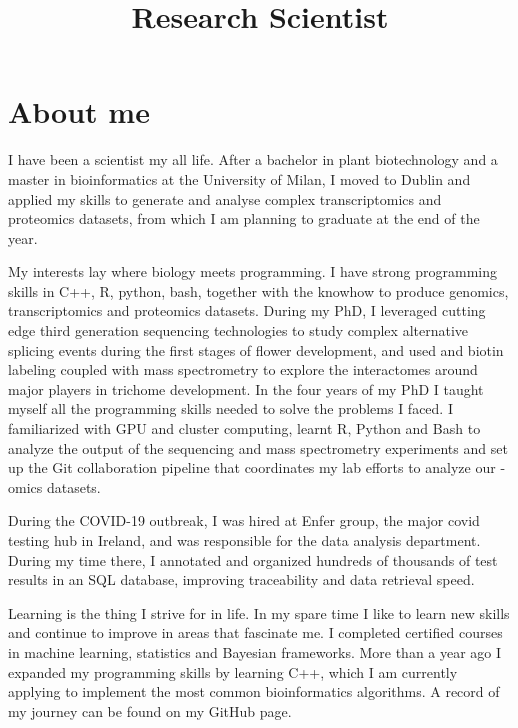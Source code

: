 \documentclass{moderncv}
\title{Research Scientist}
\begin{document}
\maketitle
\section{About me}
I have been a scientist my all life. After a bachelor in plant biotechnology
and a master in bioinformatics at the University of Milan, I moved to Dublin
and applied my skills to generate and analyse complex transcriptomics and
proteomics datasets, from which I am planning to graduate at the end of the
year.

My interests lay where biology meets programming. I have strong programming
skills in C++, R, python, bash, together with the knowhow to produce genomics,
transcriptomics and proteomics datasets. During my PhD, I leveraged cutting
edge third generation sequencing technologies to study complex alternative
splicing events during the first stages of flower development, and used and
biotin labeling coupled with mass spectrometry to explore the interactomes
around major players in trichome development. In the four years of my PhD I
taught myself all the programming skills needed to solve the problems I faced.
I familiarized with GPU and cluster computing, learnt R, Python and Bash to
analyze the output of the sequencing and mass spectrometry experiments and set
up the Git collaboration pipeline that coordinates my lab efforts to analyze
our -omics datasets.

During the COVID-19 outbreak, I was hired at Enfer group, the major covid
testing hub in Ireland, and was responsible for the data analysis department.
During my time there, I annotated and organized hundreds of thousands of test
results in an SQL database, improving traceability and data retrieval speed.

Learning is the thing I strive for in life. In my spare time I like to learn
new skills and continue to improve in areas that fascinate me. I completed
certified courses in machine learning, statistics and Bayesian frameworks.
More than a year ago I expanded my programming skills by learning C++, which I
am currently applying to implement the most common bioinformatics algorithms.
A record of my journey can be found on my GitHub page.
\end{document}
